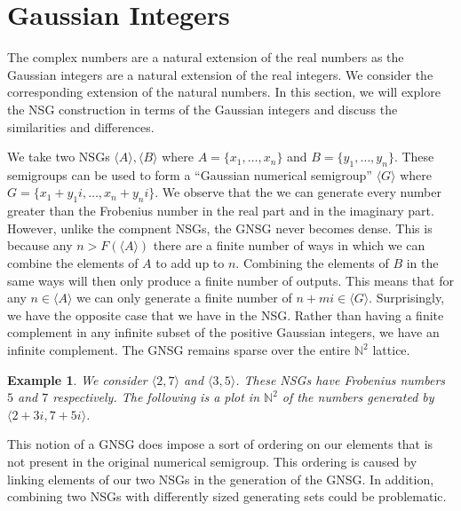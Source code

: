 \documentclass[11pt]{amsart}
\theoremstyle{plain}
\newtheorem{exa}{Example}
\theoremstyle{definition}
\begin{document}
\section{Gaussian Integers}
The complex numbers are a natural extension of the real numbers as the Gaussian integers are a natural extension of the real integers. We consider the corresponding extension of the natural numbers. In this section, we will explore the NSG construction in terms of the Gaussian integers and discuss the similarities and differences.

We take two NSGs $\langle A\rangle, \langle B\rangle$ where $A=\{x_1,\dots,x_n\}$ and $B=\{y_1,\dots,y_n\}$.
These semigroups can be used to form a ``Gaussian numerical semigroup'' $\langle G\rangle$ where $G=\{x_1+y_1i,\dots,x_n+y_ni\}$.
We observe that the we can generate every number greater than the Frobenius number in the real part and in the imaginary part.
However, unlike the compnent NSGs, the GNSG never becomes dense.
This is because any $n>F(\langle A\rangle)$ there are a finite number of ways in which we can combine the elements of $A$ to add up to $n$.
Combining the elements of $B$ in the same ways will then only produce a finite number of outputs.
This means that for any $n\in \langle A\rangle$ we can only generate a finite number of $n+mi\in \langle G\rangle$.
Surprisingly, we have the opposite case that we have in the NSG.
Rather than having a finite complement in any infinite subset of the positive Gaussian integers, we have an infinite complement.
The GNSG remains sparse over the entire $\mathbb{N}^2$ lattice.

\begin{exa}
We consider $\langle 2,7\rangle$ and $\langle 3,5\rangle$. These NSGs have Frobenius numbers $5$ and $7$ respectively\cite{frobmask}. The following is a plot in $\mathbb{N}^2$ of the numbers generated by $\langle 2+3i,7+5i\rangle$.

\begin{center}
\end{center}
\end{exa}
This notion of a GNSG does impose a sort of ordering on our elements that is not present in the original numerical semigroup. This ordering is caused by linking elements of our two NSGs in the generation of the GNSG. In addition, combining two NSGs with differently sized generating sets could be problematic.
\end{document}
